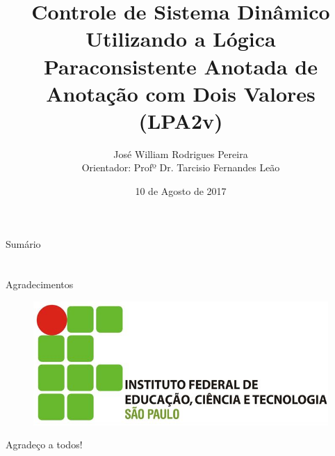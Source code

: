\documentclass[handout,t]{beamer}
\title[]{
Controle de Sistema Dinâmico Utilizando a Lógica Paraconsistente Anotada de Anotação com Dois Valores (LPA2v)}
\date{10 de Agosto de 2017}
\author[José W. R. Pereira]
{
	José William Rodrigues Pereira\inst{1}\\
	\vspace{0.25cm}
	Orientador: Profº Dr. Tarcisio Fernandes Leão\inst{2}
}
\institute[INSTITUTO]
{
	\inst{1}%
	\url{josewrpereira@gmail.com}\\
	\vspace{0.25cm}
	\inst{2}%
	\url{leao@ifsp.edu.br}
\
}
\begin{document}
\frame{\titlepage}
\section[]{}
\begin{frame}{Sumário}
	\tableofcontents
\end{frame}











\section{}
\begin{frame}{Agradecimentos}
\begin{figure}[!htb]
\center\includegraphics[scale=0.6]{./figuras/logo_IFSP.jpg}
\end{figure}

\centering

\vspace{1cm}
Agradeço a todos!
	
\end{frame}
\end{document}

